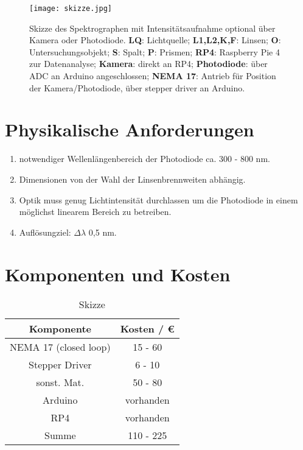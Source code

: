 \begin{figure}[H]
    \centering
    \texttt{[image: skizze.jpg]}
    \caption{
        Skizze des Spektrographen mit Intensitätsaufnahme optional über Kamera oder Photodiode.
        \textbf{LQ}: Lichtquelle; 
        \textbf{L1,L2,K,F}: Linsen; 
        \textbf{O}: Untersuchungsobjekt; 
        \textbf{S}: Spalt; 
        \textbf{P}: Prismen; 
        \textbf{RP4}: Raspberry Pie 4 zur Datenanalyse; 
        \textbf{Kamera}: direkt an RP4; 
        \textbf{Photodiode}: über ADC an Arduino angeschlossen; 
        \textbf{NEMA 17}: Antrieb für Position der Kamera/Photodiode, über stepper driver an Arduino.
    }
    \label{fig:skizze}
\end{figure}


\section*{Physikalische Anforderungen}
\begin{enumerate}
    \item notwendiger Wellenlängenbereich der Photodiode ca. 300 - 800 nm.
    \item Dimensionen von der Wahl der Linsenbrennweiten abhängig.
    \item Optik muss genug Lichtintensität durchlassen um die Photodiode in einem möglichst linearem Bereich zu betreiben.
    \item Auflösungziel: $\Delta \lambda$ 0,5 nm.
\end{enumerate}


\section*{Komponenten und Kosten}
\begin{table}[H]
    \centering
    \caption{
        Skizze
    }
    \begin{tabular}{| c | c |}
        \hline
        Komponente &  Kosten / \euro{}\\
        \hline
        NEMA 17 (closed loop)& 15 - 60  \\
        \hline
        Stepper Driver & 6 - 10  \\
        \hline
        sonst. Mat. & 50 - 80 \\
        \hline
        Arduino & vorhanden \\
        \hline
        RP4 & vorhanden \\
        \hline
        \hline
        Summe & 110 - 225  \\
        \hline
    \end{tabular}
    \label{tab:Komponenten}
\end{table}



